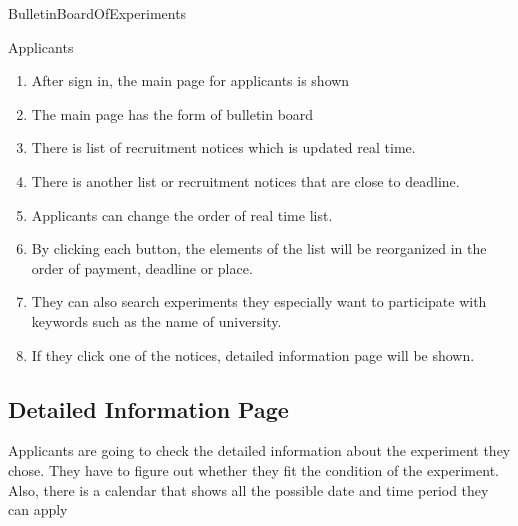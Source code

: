 \documentclass[letterpaper, 10 pt, conference]{ieeeconf}  %
\begin{document}
BulletinBoardOfExperiments\\

Applicants\\

\begin{enumerate}
    \item After sign in, the main page for applicants is shown
\item The main page has the form of bulletin board
\item There is list of recruitment notices which is updated real time.
\item There is another list or recruitment notices that are close to deadline. 
\item Applicants can change the order of real time list.
\item By clicking each button, the elements of the list will be reorganized in the order of payment, deadline or place.
\item They can also search experiments they especially want to participate with keywords such as the name of university.
\item If they click one of the notices, detailed information page will be shown.
\end{enumerate}


\subsection{Detailed Information Page}
Applicants are going to check the detailed information about the experiment they chose. They have to figure out whether they fit the condition of the experiment. Also, there is a calendar that shows all the possible date and time period they can apply\\
\end{document}
